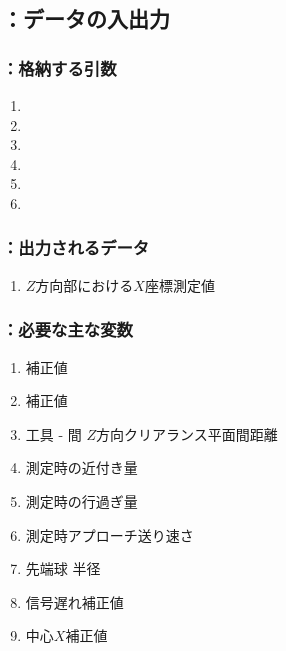 \subsection{\MXOface：データの入出力}

\subsubsection{\MXOface：格納する引数}
\begin{enumerate}[label*=\sarrow]
\item \PMACOD
\item \PMKeywayACOD
\item \PMTopReAlocationLength
\item \PMKeywayWidth
\item \PMKeywayPos
\item \PMAsideKeywayDepth
\end{enumerate}

\subsubsection{\MXOface：出力されるデータ}
\begin{enumerate}[label*=\sarrow]
\item $Z$方向\KeywayCenter 部における\KeywayCenter$X$座標測定値
\end{enumerate}

\subsubsection{\MXOface：必要な主な変数}
\begin{enumerate}[label*=\sarrow]
\item \KeywayPos 補正値
\item \KeywayWidth 補正値
\item 工具 - \EndFace 間 $Z$方向クリアランス平面間距離
\item \TouchSensorProbe 測定時の近付き量
\item \TouchSensorProbe 測定時の行過ぎ量
\item \TouchSensorProbe 測定時アプローチ送り速さ
\item \TouchSensorProbe 先端球 半径
\item \TouchSensorProbe 信号遅れ補正値
\item \TouchSensorProbe 中心$X$補正値
\end{enumerate}


